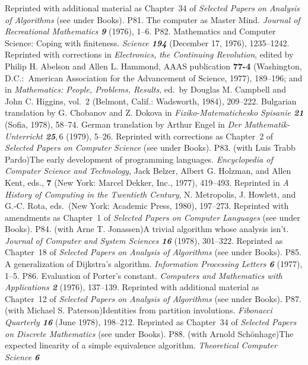  Reprinted with additional material as Chapter~34 of {\sl Selected Papers
 on Analysis of Algorithms\/} (see under Books).
\p P81.  The computer as Master Mind.
 {\sl Journal of Recreational Mathematics\/ \bf 9} (1976), 1--6.  
\p P82.  Mathematics and Computer Science:  Coping with finiteness. 
 {\sl Science\/ \bf 194} (December 17, 1976), 1235--1242.  Reprinted
 with corrections in {\sl Electronics, the Continuing Revolution}, 
 edited by Philip H. Abelson and Allen L. Hammond, AAAS publication {\bf 77-4}
 (Washington, D.C.:\ American Association for the Advancement of Science,
 1977), 189--196; 
 and in {\sl Mathematics: People, Problems, Results}, ed.\ by Douglas M.
 Campbell and John C. Higgins, vol.~2 (Belmont, Calif.:  Wadsworth, 1984),
 209--222. Bulgarian translation by G. Chobanov and Z. Dokova in
 {\sl Fiziko-Matematichesko Spisanie\/ \bf 21} (Sofia, 1978), 58--74.
 German translation by Arthur Engel in {\sl Der Mathematik-Unterricht\/
 \bf 25},\,6 (1979), 5--26.
 Reprinted with corrections as Chapter~2 of {\sl Selected Papers on
 Computer Science\/} (see under Books).
\p P83.  (with Luis Trabb Pardo)\xskip  The early development of programming
 languages.  {\sl Encyclopedia of Computer Science and Technology},
 Jack Belzer, Albert G. Holzman, and Allen Kent, eds., {\bf 7}
 (New York: Marcel Dekker, Inc., 1977), 419--493.  
 Reprinted in {\sl A History of Computing in the Twentieth Century},
 N. Metropolis, J. Howlett, and G.-C. Rota, eds.\ (New York:
 Academic Press, 1980), 197--273.
 Reprinted with amendments as Chapter~1 of {\sl Selected Papers on
 Computer Languages\/} (see under Books).
\p P84.  (with Arne T. Jonassen)\xskip  A trivial algorithm whose analysis
 isn't.
 {\sl Journal of Computer and System Sciences\/ \bf 16} (1978), 301--322.
 Reprinted as Chapter~18 of {\sl Selected Papers on Analysis of Algorithms\/}
 (see under Books).
\p P85.  A generalization of Dijkstra's algorithm.  {\sl Information
 Processing Letters\/ \bf 6} (1977), 1--5.  
\p P86.  Evaluation of Porter's constant.  {\sl Computers 
 and Mathematics with Applications\/ \bf 2} (1976), 137--139.  
 Reprinted with additional material as Chapter~12 of {\sl Selected Papers on
 Analysis of Algorithms\/} (see under Books). 
\p P87.  (with Michael S. Paterson)\xskip  Identities from partition
 involutions. {\sl Fibonacci Quarterly\/ \bf 16} (June 1978), 198--212.
 Reprinted as Chapter~34 of {\sl Selected Papers on
 Discrete Mathematics\/} (see under Books).
\p P88.  (with Arnold Sch\"onhage)\xskip  The expected linearity of a simple
 equivalence algorithm.  {\sl Theoretical Computer Science\/ \bf 6}
